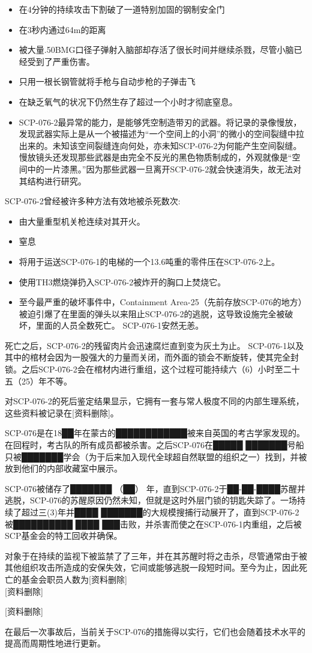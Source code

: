 \begin{itemize}
\item 在4分钟的持续攻击下割破了一道特别加固的钢制安全门
\item 在3秒内通过64m的距离
\item 被大量.50BMG口径子弹射入脑部却存活了很长时间并继续杀戮，尽管小脑已经受到了严重伤害。
\item 只用一根长钢管就将手枪与自动步枪的子弹击飞
\item 在缺乏氧气的状况下仍然生存了超过一个小时才彻底窒息。
\item SCP-076-2最异常的能力，是能够凭空制造带刃的武器。将记录的录像慢放，发现武器实际上是从一个被描述为“一个空间上的小洞”的微小的空间裂缝中拉出来的。未知该空间裂缝连向何处，亦未知SCP-076-2为何能产生空间裂缝。慢放镜头还发现那些武器是由完全不反光的黑色物质制成的，外观就像是“空间中的一片漆黑。”因为那些武器一旦离开SCP-076-2就会快速消失，故无法对其结构进行研究。
\end{itemize}

SCP-076-2曾经被许多种方法有效地被杀死数次:

\begin{itemize}
\item 由大量重型机关枪连续对其开火。
\item 窒息
\item 将用于运送SCP-076-1的电梯的一个13.6吨重的零件压在SCP-076-2上。
\item 使用TH3燃烧弹扔入SCP-076-2被炸开的胸口上焚烧它。
\item 至今最严重的破坏事件中，Containment Area-25（先前存放SCP-076的地方）被迫引爆了在里面的弹头以来阻止SCP-076-2的逃脱，这导致设施完全被破坏，里面的人员全数死亡。 SCP-076-1安然无恙。
\end{itemize}

死亡之后，SCP-076-2的残留肉片会迅速腐烂直到变为灰土为止。 SCP-076-1以及其中的棺材会因为一股强大的力量而关闭，而外面的锁会不断旋转，使其完全封锁。之后SCP-076-2会在棺材内进行重组，这个过程可能持续六（6）小时至二十五（25）年不等。

对SCP-076-2的死后鉴定结果显示，它拥有一套与常人极度不同的内部生理系统，这些资料被记录在{[}资料删除]。

\hr

SCP-076是在18██年在蒙古的████████████被来自英国的考古学家发现的。在回程时，考古队的所有成员都被杀害。之后SCP-076在█████ ███████号船只被███████学会（为于后来加入现代全球超自然联盟的组织之一）找到，并被放到他们的内部收藏室中展示。

SCP-076被储存了███████ （██） 年，直到SCP-076-2于██-██-████苏醒并逃脱，SCP-076的苏醒原因仍然未知，但就是这时外层门锁的钥匙失踪了。一场持续了超过三(3)年并████ ███████的大规模搜捕行动展开了，直到SCP-076-2被██████████ ████ ███击败，并杀害而使之在SCP-076-1内重组，之后被SCP基金会的特工回收并确保。

对象于在持续的监视下被监禁了了三年，并在其苏醒时将之击杀，尽管通常由于被其他组织攻击所造成的安保失效，它间或能够逃脱一段短时间。至今为止，因此死亡的基金会职员人数为{[}资料删除]\\
{[}资料删除]

{[}资料删除]

在最后一次事故后，当前关于SCP-076的措施得以实行，它们也会随着技术水平的提高而周期性地进行更新。

